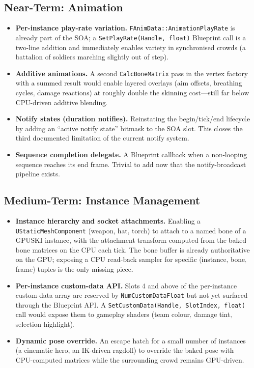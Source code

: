 \documentclass[11pt, a4paper]{article}
\begin{document}
\subsection{Near-Term: Animation}

\begin{itemize}[leftmargin=1.5em]
    \item \textbf{Per-instance play-rate variation.} \texttt{FAnimData::AnimationPlayRate} is already part of the SOA; a \texttt{SetPlayRate(Handle, float)} Blueprint call is a two-line addition and immediately enables variety in synchronised crowds (a battalion of soldiers marching slightly out of step).
    \item \textbf{Additive animations.} A second \texttt{CalcBoneMatrix} pass in the vertex factory with a summed result would enable layered overlays (aim offsets, breathing cycles, damage reactions) at roughly double the skinning cost---still far below CPU-driven additive blending.
    \item \textbf{Notify states (duration notifies).} Reinstating the begin/tick/end lifecycle by adding an ``active notify state'' bitmask to the SOA slot. This closes the third documented limitation of the current notify system.
    \item \textbf{Sequence completion delegate.} A Blueprint callback when a non-looping sequence reaches its end frame. Trivial to add now that the notify-broadcast pipeline exists.
\end{itemize}

\subsection{Medium-Term: Instance Management}

\begin{itemize}[leftmargin=1.5em]
    \item \textbf{Instance hierarchy and socket attachments.} Enabling a \texttt{UStaticMeshComponent} (weapon, hat, torch) to attach to a named bone of a GPUSKI instance, with the attachment transform computed from the baked bone matrices on the CPU each tick. The bone buffer is already authoritative on the GPU; exposing a CPU read-back sampler for specific (instance, bone, frame) tuples is the only missing piece.
    \item \textbf{Per-instance custom-data API.} Slots 4 and above of the per-instance custom-data array are reserved by \texttt{NumCustomDataFloat} but not yet surfaced through the Blueprint API. A \texttt{SetCustomData(Handle, SlotIndex, float)} call would expose them to gameplay shaders (team colour, damage tint, selection highlight).
    \item \textbf{Dynamic pose override.} An escape hatch for a small number of instances (a cinematic hero, an IK-driven ragdoll) to override the baked pose with CPU-computed matrices while the surrounding crowd remains GPU-driven.
\end{itemize}
\end{document}
